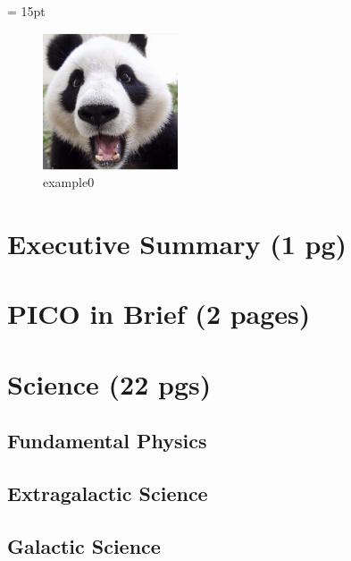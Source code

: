 \documentclass[12pt]{article}
\begin{document}


\setlength{\baselineskip}{0.96\baselineskip} %
\setlength{\parskip}{1.\parskip}

\parindent = 15pt

\tableofcontents

\setcounter{page}{0}
\setcounter{figure}{0}

\newpage

\begin{figure}[!htb]
\centering
\includegraphics[width=4cm]{../images/example0}
\caption{example0}
\label{fig:im_1}
\end{figure}
%

\section{Executive Summary (1 pg)} 


\section{PICO in Brief (2 pages)}


\section{Science (22 pgs)}

\subsection{Fundamental Physics}


\subsection{Extragalactic Science}


\subsection{Galactic Science}

\end{document}
